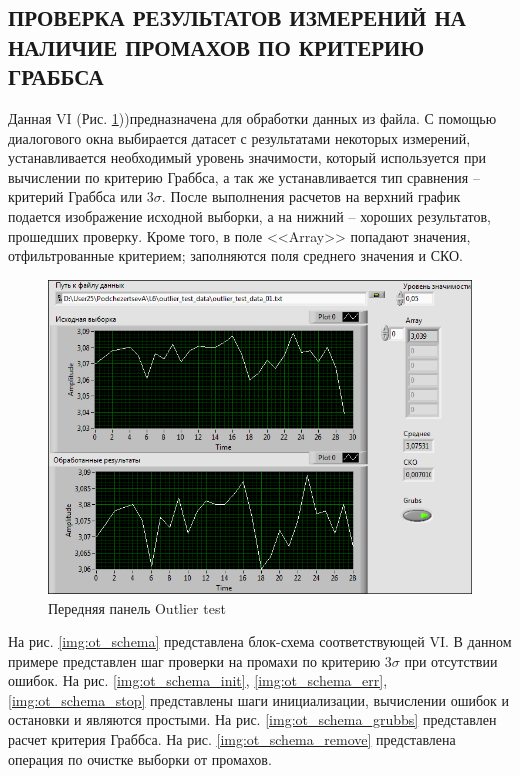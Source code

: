 \documentclass[a4paper,14pt]{article}
\begin{document}
\subsection{ПРОВЕРКА РЕЗУЛЬТАТОВ ИЗМЕРЕНИЙ НА НАЛИЧИЕ ПРОМАХОВ ПО КРИТЕРИЮ ГРАББСА}

Данная VI (Рис. \ref{img:ot_vi}))предназначена для обработки данных из файла.
С помощью диалогового окна выбирается датасет с результатами некоторых измерений, устанавливается необходимый уровень значимости, который используется при вычислении по критерию Граббса, а так же устанавливается тип сравнения -- критерий Граббса или $3\sigma$.
После выполнения расчетов на верхний график подается изображение исходной выборки, а на нижний -- хороших результатов, прошедших проверку.
Кроме того, в поле <<Array>> попадают значения, отфильтрованные критерием; заполняются поля среднего значения и СКО.

\begin{figure}[H]
	\centering		
	\includegraphics[width=\linewidth]{image/ot_vi}
	\caption{Передняя панель Outlier test}\label{img:ot_vi}
\end{figure}

На рис. \ref{img:ot_schema} представлена блок-схема соответствующей VI.
В данном примере представлен шаг проверки на промахи по критерию $3\sigma$ при отсутствии ошибок.
На рис. \ref{img:ot_schema_init}, \ref{img:ot_schema_err}, \ref{img:ot_schema_stop} представлены шаги инициализации, вычислении ошибок и остановки и являются простыми.
На рис. \ref{img:ot_schema_grubbs} представлен расчет критерия Граббса.
На рис. \ref{img:ot_schema_remove} представлена операция по очистке выборки от промахов.
\end{document}
